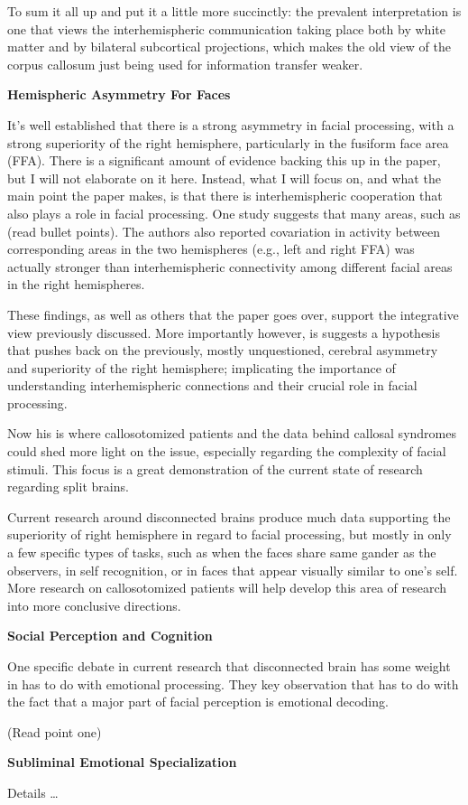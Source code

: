 \documentclass[basic]{inVerba-notes}
\begin{document}
To sum it all up and put it a little more succinctly: the prevalent interpretation is one that views the interhemispheric communication taking place both by white matter and by bilateral subcortical projections, which makes the old view of the corpus callosum just being used for information transfer weaker.

\textbf{Hemispheric Asymmetry For Faces}

It's well established that there is a strong asymmetry in facial processing, with a strong superiority of the right hemisphere, particularly in the fusiform face area (FFA). There is a significant amount of evidence backing this up in the paper, but I will not elaborate on it here. Instead, what I will focus on, and what the main point the paper makes, is that there is interhemispheric cooperation that also plays a role in facial processing. One study suggests that many areas, such as (read bullet points). The authors also reported covariation in activity between corresponding areas in the two hemispheres (e.g., left and right FFA) was actually stronger than interhemispheric connectivity among different facial areas in the right hemispheres.

These findings, as well as others that the paper goes over, support the integrative view previously discussed. More importantly however, is suggests a hypothesis that pushes back on the previously, mostly unquestioned, cerebral asymmetry and superiority of the right hemisphere; implicating the importance of understanding interhemispheric connections and their crucial role in facial processing.

Now his is where callosotomized patients and the data behind callosal syndromes could shed more light on the issue, especially regarding the complexity of facial stimuli. This focus is a great demonstration of the current state of research regarding split brains. 

Current research around disconnected brains produce much data supporting the superiority of right hemisphere in regard to facial processing, but mostly in only a few specific types of tasks, such as when the faces share same gander as the observers, in self recognition, or in faces that appear visually similar to one's self. More research on callosotomized patients will help develop this area of research into more conclusive directions.

\textbf{Social Perception and Cognition}

One specific debate in current research that disconnected brain has some weight in has to do with emotional processing. They key observation that has to do with the fact that a major part of facial perception is emotional decoding.

(Read point one)



\textbf{Subliminal Emotional Specialization}

Details \dots 
\end{document}
